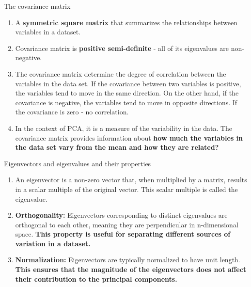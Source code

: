 \documentclass{beamer}
\begin{document}
\begin{frame}{The covariance matrix}
    \begin{enumerate}
        \item A \textbf{symmetric square matrix} that summarizes the relationships between variables in a dataset.
        \item Covariance matrix is \textbf{positive semi-definite} - all of its eigenvalues are non-negative.
        \item The covariance matrix determine the degree of correlation between the variables in the data set. If the covariance between two variables is positive, the variables tend to move in the same direction. On the other hand, if the covariance is negative, the variables tend to move in opposite directions. If the covariance is zero - no correlation.
        \item In the context of PCA, it is a measure of the variability in the data. The covariance matrix provides information about \textbf{how much the variables in the data set vary from the mean and how they are related?}
    \end{enumerate}
\end{frame}

\begin{frame}{Eigenvectors and eigenvalues and their properties }
    \begin{enumerate}
        \item An eigenvector is a non-zero vector that, when multiplied by a matrix, results in a scalar multiple of the original vector. This scalar multiple is called the eigenvalue.
        \item \textbf{Orthogonality:} Eigenvectors corresponding to distinct eigenvalues are orthogonal to each other, meaning they are perpendicular in n-dimensional space. \textbf{This property is useful for separating different sources of variation in a dataset.}
        \item \textbf{Normalization:} Eigenvectors are typically normalized to have unit length. \textbf{This ensures that the magnitude of the eigenvectors does not affect their contribution to the principal components.}
    \end{enumerate}
\end{frame}
\end{document}
